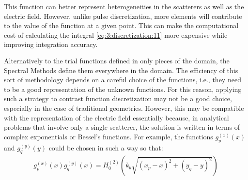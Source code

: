 			This function can better represent heterogeneities in the scatterers as well as the electric field. However, unlike pulse discretization, more elements will contribute to the value of the function at a given point. This can make the computational cost of calculating the integral \eqref{eq:3:discretization:11} more expensive while improving integration accuracy.
			
			Alternatively to the trial functions defined in only pieces of the domain, the Spectral Methods define them everywhere in the domain. The efficiency of this sort of methodology depends on a careful choice of the functions, i.e., they need to be a good representation of the unknown functions. For this reason, applying such a strategy to contrast function discretization may not be a good choice, especially in the case of traditional geometries. However, this may be compatible with the representation of the electric field essentially because, in analytical problems that involve only a single scatterer, the solution is written in terms of complex exponentials or Bessel's functions. For example, the functions $g^{(x)}_p(x)$ and $g^{(y)}_q(y)$ could be chosen in such a way so that:
			\begin{align}
				g^{(x)}_p(x)g^{(y)}_q(x) = H^{(2)}_0(k_b\sqrt{(x_p-x)^2+(y_q-y)^2}) \label{eq:3:discretization:collocation:21} 
			\end{align}

